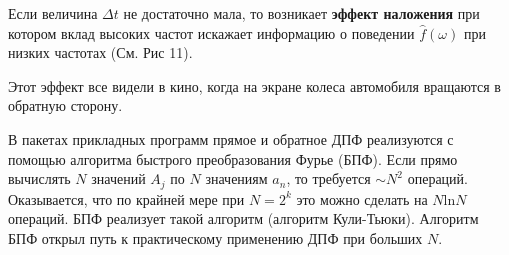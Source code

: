 Если величина $\Delta t$ не достаточно мала, то возникает \textbf{эффект наложения} при котором вклад высоких частот искажает информацию о поведении $\hat{f}(\omega)$ при низких частотах (См. Рис 11).

Этот эффект все видели в кино, когда на экране колеса автомобиля вращаются в обратную сторону.

В пакетах прикладных программ прямое и обратное ДПФ реализуются с помощью алгоритма быстрого преобразования Фурье (БПФ). Если прямо вычислять $N$ значений $A_j$ по $N$ значениям $a_n$, то требуется $\sim N^2$ операций. Оказывается, что по крайней мере при $N = 2^k$ это можно сделать на $N \mathrm{ln}N$ операций. БПФ реализует такой алгоритм (алгоритм Кули-Тьюки). Алгоритм БПФ открыл путь к практическому применению ДПФ при больших $N$.